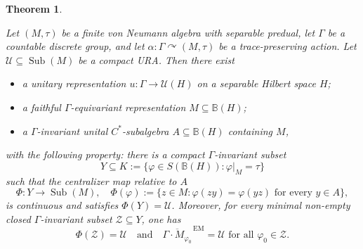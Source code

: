 \documentclass[12pt]{amsart} %
\theoremstyle{plain}
\newtheorem{theorem}{Theorem}[section]
\theoremstyle{definition}
\newcommand{\B}{\mathbb{B}}
\newcommand{\Ucal}{\mathcal{U}}
\DeclareMathOperator{\Sub}{Sub}
\begin{document}
\begin{theorem}\label{ThmCompactURA}
{
Let $(M,\tau)$ be a finite von Neumann algebra with separable predual, let
$\Gamma$ be a countable discrete group, and let
$\alpha:\Gamma\curvearrowright(M,\tau)$ be a trace-preserving action. Let
$\mathcal U\subseteq\Sub(M)$ be a compact URA. Then there exist
\begin{itemize}
\item a unitary representation
$u:\Gamma\to\Ucal(H)$ on a separable Hilbert space $H$;
\item a faithful $\Gamma$-equivariant representation
$M\subseteq\B(H)$;
\item  a $\Gamma$-invariant unital $C^*$-subalgebra
$A\subseteq\B(H)$ containing $M$,
\end{itemize}
with the following property: there is a
compact $\Gamma$-invariant subset
$$
Y\subseteq K:=\{\varphi\in S(\B(H)):\varphi|_M=\tau\}
$$
such that the centralizer map relative to $A$
$$
\Phi:Y\to\Sub(M),
\quad
\Phi(\varphi)
:=
\{z\in M:\varphi(zy)=\varphi(yz)\text{ for every }y\in A\},
$$
is continuous and satisfies $\Phi(Y)=\mathcal U$. Moreover, for every
minimal non-empty closed $\Gamma$-invariant subset
$\mathcal Z\subseteq Y$, one has
$$\Phi(\mathcal Z)=\mathcal U\quad\text{and}\quad\overline{\Gamma\cdot M_{\varphi_0}}^{\,\mathrm{EM}}=\mathcal U\text{ for all }\varphi_0\in\mathcal Z.$$
}
\end{theorem}
\end{document}
